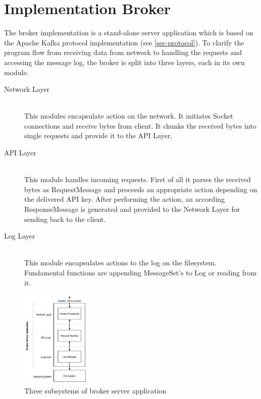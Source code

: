 \chapter{Implementation Broker}
\label{chap:broker}
The broker implementation is a stand-alone server application which is based on the
Apache Kafka protocol implementation (see \ref{sec-protocol}). To clarify the
program flow from receiving data from network to handling the requests and
accessing the message log, the broker is split into three
layers, each in its own module. 

\begin{description}
    \item [Network Layer] \hfill \\
        This modules encapsulate action on the network. It initiates Socket
        connections and receive bytes from client. It chunks the received bytes
        into single requests and provide it to the API Layer. 
    \item [API Layer] \hfill \\
        This module handles incoming requests. First of all it parses the
        received bytes as RequestMessage and proceeds an appropriate action
        depending on the delivered API key. After performing the action, an
        according ResponseMessage is generated and provided to the Network Layer
        for sending back to the client. 
    \item [Log Layer] \hfill \\
        This module encapsulates actions to the log on the filesystem.
        Fundamental functions are appending MessageSet's to Log or reading from
        it. 
\end{description}

\begin{figure}[H]
    \centering
    \includegraphics[width=0.3\textwidth]{images/impl-brok-layers.png}
    \caption{Three subsystems of broker server application}
    \label{fig:impl-brok-layers}
\end{figure}


